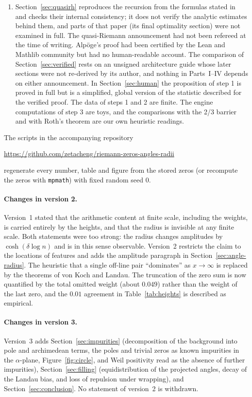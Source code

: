 \documentclass[11pt,a4paper]{article}
\theoremstyle{definition}\newtheorem{definition}[proposition]{Definition}
\theoremstyle{remark}\newtheorem{remark}[proposition]{Remark}
\begin{document}
\begin{enumerate}[label=(\roman*)]
\item Section~\ref{sec:quasirh} reproduces the recursion from the formulas stated in \cite{Liu2026} and checks their internal consistency; it does not verify the analytic estimates behind them, and parts of that paper (its final optimality section) were not examined in full. The quasi-Riemann announcement had not been refereed at the time of writing. Alp\"oge's proof had been certified by the Lean and Mathlib community but had no human-readable account. The comparison of Section~\ref{sec:verified} rests on an unsigned architecture guide whose later sections were not re-derived by its author, and nothing in Parts~I--IV depends on either announcement. In Section~\ref{sec:human} the proposition of step 1 is proved in full but is a simplified, global version of the statistic described for the verified proof. The data of steps 1 and 2 are finite. The engine computations of step 3 are toys, and the comparisons with the 2/3 barrier and with Roth's theorem are our own heuristic readings.
\end{enumerate}
The scripts in the accompanying repository
\begin{center}\url{https://github.com/zetacheng/riemann-zeros-angles-radii}\end{center}
regenerate every number, table and figure from the stored zeros (or recompute the zeros with \texttt{mpmath}) with fixed random seed $0$.

\paragraph{Changes in version 2.} Version~1 stated that the arithmetic content at finite scale, including the weights, is carried entirely by the heights, and that the radius is invisible at any finite scale. Both statements were too strong: the radius changes amplitudes by $\cosh(\delta\log n)$ and is in this sense observable. Version~2 restricts the claim to the locations of features and adds the amplitude paragraph in Section~\ref{sec:angle-radius}. The heuristic that a single off-line pair ``dominates'' as $x\to\infty$ is replaced by the theorems of von Koch and Landau. The truncation of the zero sum is now quantified by the total omitted weight (about $0.049$) rather than the weight of the last zero, and the $0.01$ agreement in Table~\ref{tab:heights} is described as empirical.

\paragraph{Changes in version 3.} Version~3 adds Section~\ref{sec:impurities} (decomposition of the background into pole and archimedean terms, the poles and trivial zeros as known impurities in the $\alpha$-plane, Figure~\ref{fig:circle}, and Weil positivity read as the absence of further impurities), Section~\ref{sec:filling} (equidistribution of the projected angles, decay of the Landau bias, and loss of repulsion under wrapping), and Section~\ref{sec:conclusion}. No statement of version~2 is withdrawn.
\end{document}
